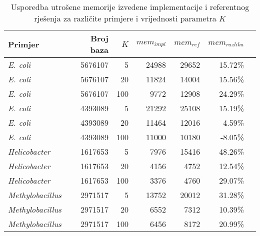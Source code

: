 \documentclass[times, utf8, seminar, numeric]{fer}
\begin{document}
\begin{table}[h]
	\centering
	\caption{Usporedba utrošene memorije izvedene implementacije i referentnog rješenja za različite primjere i vrijednosti parametra $K$}
	\label{tbl:memory-bacteria}
	
	\begin{tabular}{lrrrrrr}
		\hline
		Primjer & Broj baza & $K$ & $mem_{impl}$ & $mem_{ref}$ & $mem_{razlika}$ \\ \hline
        \textit{E. coli} & 5676107 & 5 & 24988 & 29652 & 15.72\% \\
        \textit{E. coli} & 5676107 & 20 & 11824 & 14004 & 15.56\% \\
        \textit{E. coli} & 5676107 & 100 & 9772 & 12908 & 24.29\% \\ \hline
        \textit{E. coli} & 4393089 & 5 & 21292 & 25108 & 15.19\% \\
        \textit{E. coli} & 4393089 & 20 & 11464 & 12016 & 4.59\% \\
        \textit{E. coli} & 4393089 & 100 & 11000 & 10180 & -8.05\% \\ \hline
        \textit{Helicobacter} & 1617653 & 5 & 7976 & 15416 & 48.26\% \\
        \textit{Helicobacter} & 1617653 & 20 & 4156 & 4752 & 12.54\% \\
        \textit{Helicobacter} & 1617653 & 100 & 3376 & 4760 & 29.07\% \\ \hline
        \textit{Methylobacillus} & 2971517 & 5 & 13752 & 20012 & 31.28\% \\
        \textit{Methylobacillus} & 2971517 & 20 & 6552 & 7312 & 10.39\% \\
        \textit{Methylobacillus} & 2971517 & 100 & 6456 & 8172 & 20.99\% \\
    \hline
	\end{tabular}
\end{table}
\end{document}
